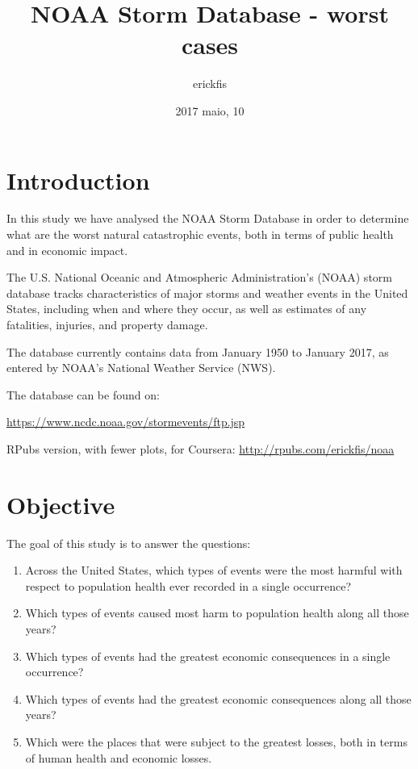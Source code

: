 \documentclass[]{article}
\title{NOAA Storm Database - worst cases}
\author{erickfis}
\date{2017 maio, 10}
\begin{document}
\maketitle

{
\setcounter{tocdepth}{3}
\tableofcontents
}
\section{Introduction}\label{introduction}

In this study we have analysed the NOAA Storm Database in order to
determine what are the worst natural catastrophic events, both in terms
of public health and in economic impact.

The U.S. National Oceanic and Atmospheric Administration's (NOAA) storm
database tracks characteristics of major storms and weather events in
the United States, including when and where they occur, as well as
estimates of any fatalities, injuries, and property damage.

The database currently contains data from January 1950 to January 2017,
as entered by NOAA's National Weather Service (NWS).

The database can be found on:

\url{https://www.ncdc.noaa.gov/stormevents/ftp.jsp}

RPubs version, with fewer plots, for Coursera:
\url{http://rpubs.com/erickfis/noaa}

\section{Objective}\label{objective}

The goal of this study is to answer the questions:

\begin{enumerate}
\def\labelenumi{\arabic{enumi}.}
\item
  Across the United States, which types of events were the most harmful
  with respect to population health ever recorded in a single
  occurrence?
\item
  Which types of events caused most harm to population health along all
  those years?
\item
  Which types of events had the greatest economic consequences in a
  single occurrence?
\item
  Which types of events had the greatest economic consequences along all
  those years?
\item
  Which were the places that were subject to the greatest losses, both
  in terms of human health and economic losses.
\end{enumerate}
\end{document}
